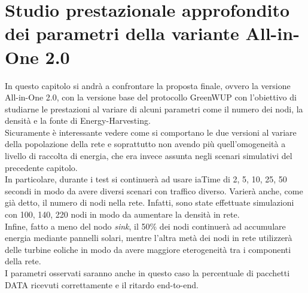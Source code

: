 \section{Studio prestazionale approfondito dei parametri della variante All-in-One 2.0}
In questo capitolo si andrà a confrontare la proposta finale, ovvero la versione All-in-One 2.0, con la versione base del protocollo GreenWUP con l'obiettivo di studiarne le prestazioni al variare di alcuni parametri come il numero dei nodi, la densità e la fonte di Energy-Harvesting.\\

Sicuramente è interessante vedere come si comportano le due versioni al variare della popolazione della rete e soprattutto non avendo più quell'omogeneità a livello di raccolta di energia, che era invece assunta negli scenari simulativi del precedente capitolo.\\

In particolare, durante i test si continuerà ad usare iaTime di 2, 5, 10, 25, 50 secondi in modo da avere diversi scenari con traffico diverso. Varierà anche, come già detto, il numero di nodi nella rete. Infatti, sono state effettuate simulazioni con 100, 140, 220 nodi in modo da aumentare la densità in rete.\\

Infine, fatto a meno del nodo \textit{sink}, il 50\% dei nodi continuerà ad accumulare energia mediante pannelli solari, mentre l'altra metà dei nodi in rete utilizzerà delle turbine eoliche in modo da avere maggiore eterogeneità tra i componenti della rete.\\

I parametri osservati saranno anche in questo caso la percentuale di pacchetti DATA ricevuti correttamente e il ritardo end-to-end. \\
\newpage

